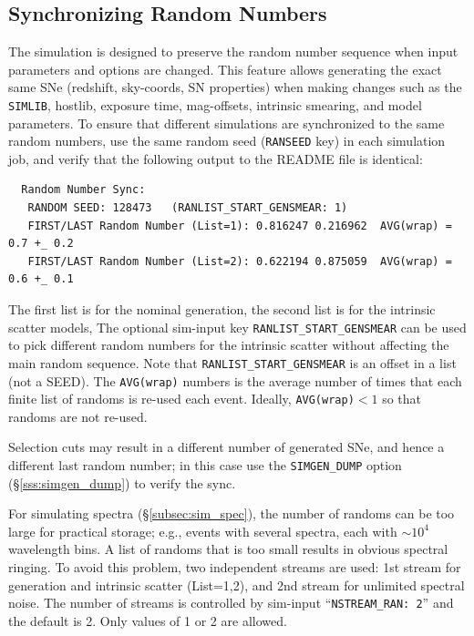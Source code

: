 \documentclass[12pt]{article}
\newcommand{\simlib}{{\tt SIMLIB}}
\newcommand{\hostlib}{{\sc hostlib}}
\begin{document}
{%
   \clearpage
   \subsection{Synchronizing Random Numbers}
   \label{subsec:sim_ransync}

The simulation is designed to preserve the random number sequence
when input parameters and options are changed. This feature allows
generating the exact same SNe (redshift, sky-coords, SN properties)
when making changes such as the 
\simlib, \hostlib, exposure time, mag-offsets, intrinsic smearing, and 
model parameters.
To ensure that different simulations are synchronized to the
same random numbers, use the same random seed ({\tt RANSEED} key)
in each simulation job, 
and verify that the following output to the README file
is identical:
\begin{verbatim}
  Random Number Sync: 
   RANDOM SEED: 128473   (RANLIST_START_GENSMEAR: 1)
   FIRST/LAST Random Number (List=1): 0.816247 0.216962  AVG(wrap) = 0.7 +_ 0.2 
   FIRST/LAST Random Number (List=2): 0.622194 0.875059  AVG(wrap) = 0.6 +_ 0.1 
\end{verbatim}
The first list is for the nominal generation, 
the second list is for the intrinsic scatter models,
The optional sim-input key {\tt RANLIST\_START\_GENSMEAR} 
can be used to pick different random numbers for the intrinsic
scatter without affecting the main random sequence.
Note that {\tt RANLIST\_START\_GENSMEAR} is an offset 
in a list (not a SEED).
The {\tt AVG(wrap)} numbers is the average number of times
that each finite list of randoms is re-used each event.
Ideally, {\tt AVG(wrap)}$<1$ so that randoms are not re-used.

Selection cuts may result in a different number of generated
SNe, and hence a different last random number; in this case
use the {\tt SIMGEN\_DUMP} option (\S\ref{sss:simgen_dump})
to verify the sync.

For simulating spectra (\S\ref{subsec:sim_spec}), the number
of randoms can be too large for practical storage;
e.g., events with several spectra, each with $\sim 10^4$ wavelength bins.
A  list of randoms that is too small results in obvious spectral ringing.
To avoid this problem, two independent streams are used:
1st stream for generation and intrinsic scatter (List=1,2),
and 2nd stream for unlimited spectral noise. The number of
streams is controlled by sim-input ``{\tt NSTREAM\_RAN: 2}''
and the default is 2. Only values of 1 or 2 are allowed.

}
\end{document}
